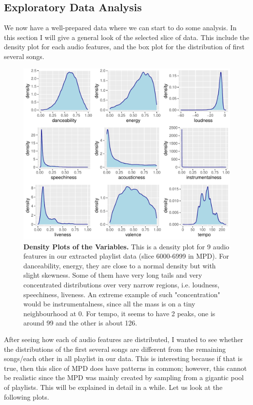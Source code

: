 \documentclass[12pt]{article}
\theoremstyle{plain}
\theoremstyle{definition}
\theoremstyle{remark}
\begin{document}
\newpage
\subsection{Exploratory Data Analysis}
We now have a well-prepared data where we can start to do some analysis. In this section I will give a general look of the selected slice of data. This include the density plot for each audio features, and the box plot for the distribution of first several songs. 

\begin{figure}[htp]
    \centering
    \includegraphics[width=\textwidth]{Images/density.pdf}
    \caption{\textbf{Density Plots of the Variables.} This is a density plot for 9 audio features in our extracted playlist data (slice 6000-6999 in MPD). For danceability, energy, they are close to a normal density but with slight skewness. Some of them have very long tails and very concentrated distributions over very narrow regions, i.e. loudness, speechiness, liveness. An extreme example of such "concentration" would be instrumentalness, since all the mass is on a tiny neighbourhood at 0. For tempo, it seems to have 2 peaks, one is around 99 and the other is about 126.}
    \label{fig:Density}
\end{figure}



After seeing how each of audio features are distributed, I wanted to see whether the distributions of the first several songs are different from the remaining songs/each other in all playlist in our data. This is interesting because if that is true, then this slice of MPD does have patterns in common; however, this cannot be realistic since the MPD was mainly created by sampling from a gigantic pool of playlists. This will be explained in detail in a while. Let us look at the following plots.
\end{document}
